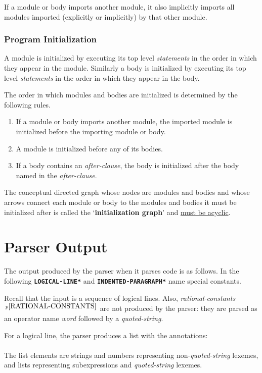 \documentclass[12pt]{article}
\newcommand{\key}[1]{{\rm \bfseries #1}}
\newcommand{\ttkey}[1]{{\tt \bfseries #1}}
\newcommand{\pagnote}[1]{$\,^{p\pageref{#1}}$}
\begin{document}
If a module or body imports another module, it also implicitly
imports\label{IMPLICIT-IMPORTS} all modules imported
(explicitly or implicitly) by that other module.

\subsubsection{Program Initialization}
\label{PROGRAM-INITIALIZATION}

A module is initialized by executing its top level {\em statements}
in the order in which they appear in the module.  Similarly
a body is initialized by executing its top level {\em statements}
in the order in which they appear in the body.

The order in which modules and bodies are initialized is determined
by the following rules.
\begin{enumerate}
\item If a module or body imports another module, the imported module
is initialized before the importing module or body.
\item A module is initialized before any of its bodies.
\item If a body contains an {\em after-clause}, the body
is initialized after the body named in the {\em after-clause}.
\end{enumerate}

The conceptual directed graph whose nodes are modules and bodies
and whose arrows connect each module or body to the modules and
bodies it must be initialized after is called
the `\key{initialization graph}'\label{INITIALIZATION-GRAPH}
and \underline{must be acyclic}.

\section{Parser Output}
\label{PARSER-OUTPUT}

The output produced by the parser when it parses code is as
follows.  In the following \ttkey{*LOGICAL-LINE*} and
\ttkey{*INDENTED-PARAGRAPH*} name special constants.

Recall that the input is a sequence of logical lines.  Also,
{\em rational-constants}\pagnote{RATIONAL-CONSTANTS}
are not produced by the parser: they are parsed as an operator
name {\em word} followed by a {\em quoted-string}.

For a logical line, the parser produces a list with the
annotations: \\
\hspace*{0.5in}{\tt ".initiator" => *LOGICAL-LINE*, ".terminator" => "<LF>"} \\
The list elements are strings and numbers representing non-{\em quoted-string}
lexemes, and lists representing subexpressions and {\em quoted-string} lexemes.
\end{document}
